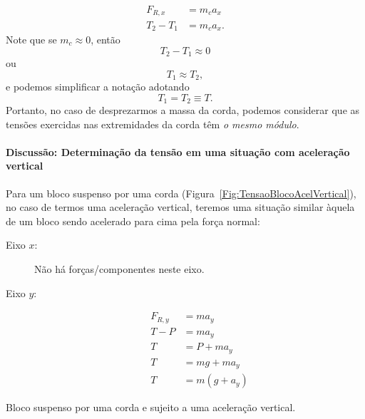 \begin{align}
    F_{R, x} &= m_c a_x \\
    T_2 - T_1 &= m_c a_x.
\end{align}
%
Note que se $m_c \approx 0$, então
\begin{equation}
    T_2 - T_1 \approx 0
\end{equation}
%
ou
\begin{equation}
    T_1 \approx T_2,
\end{equation}
%
e podemos simplificar a notação adotando
\begin{equation}
    T_1 = T_2 \equiv T.
\end{equation}
%
Portanto, no caso de desprezarmos a massa da corda, podemos considerar que as tensões exercidas nas extremidades da corda têm \emph{o mesmo módulo}.

\paragraph{Discussão: Determinação da tensão em uma situação com aceleração vertical}

Para um bloco suspenso por uma corda (Figura~\ref{Fig:TensaoBlocoAcelVertical}), no caso de termos uma aceleração vertical, teremos uma situação similar àquela de um bloco sendo acelerado para cima pela força normal:
\begin{description}
    \item[Eixo $x$:] Não há forças/componentes neste eixo.
    \item[Eixo $y$:]
        \begin{align}
            F_{R, y} &= m a_y \\
            T - P &= m a_y \\
            T &= P + m a_y \\
            T &= mg + m a_y \\
            T &= m (g + a_y)
        \end{align}
\end{description}

\begin{marginfigure}[-3cm]
\centering
{}
\caption{Bloco suspenso por uma corda e sujeito a uma aceleração vertical. \label{Fig:TensaoBlocoAcelVertical}}
\end{marginfigure}

